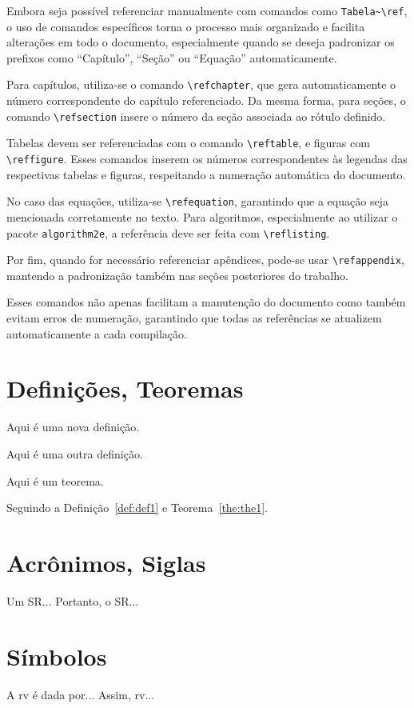 Embora seja possível referenciar manualmente com comandos como \verb|Tabela~\ref|, o uso de comandos específicos torna o processo mais organizado e facilita alterações em todo o documento, especialmente quando se deseja padronizar os prefixos como ``Capítulo'', ``Seção'' ou ``Equação'' automaticamente.

Para capítulos, utiliza-se o comando \verb|\refchapter|, que gera automaticamente o número correspondente do capítulo referenciado. Da mesma forma, para seções, o comando \verb|\refsection| insere o número da seção associada ao rótulo definido.

Tabelas devem ser referenciadas com o comando \verb|\reftable|, e figuras com \verb|\reffigure|. Esses comandos inserem os números correspondentes às legendas das respectivas tabelas e figuras, respeitando a numeração automática do documento.

No caso das equações, utiliza-se \verb|\refequation|, garantindo que a equação seja mencionada corretamente no texto. Para algoritmos, especialmente ao utilizar o pacote \verb|algorithm2e|, a referência deve ser feita com \verb|\reflisting|.

Por fim, quando for necessário referenciar apêndices, pode-se usar \verb|\refappendix|, mantendo a padronização também nas seções posteriores do trabalho.

Esses comandos não apenas facilitam a manutenção do documento como também evitam erros de numeração, garantindo que todas as referências se atualizem automaticamente a cada compilação.

\section{Definições, Teoremas}

\begin{definition}\label{def:def1}
  Aqui é uma nova definição.
\end{definition}

\begin{definition}[Título] \label{def:def2}
  Aqui é uma outra definição.
\end{definition}

\begin{theorem}\label{the:the1}
  Aqui é um teorema.
\end{theorem}

Seguindo a Definição~\ref{def:def1} e Teorema~\ref{the:the1}.



\section{Acrônimos, Siglas}
  Um \ac{SR}... Portanto, o \ac{SR}...


\section{Símbolos}
  A \ac{rv} é dada por... Assim, \ac{rv}...
